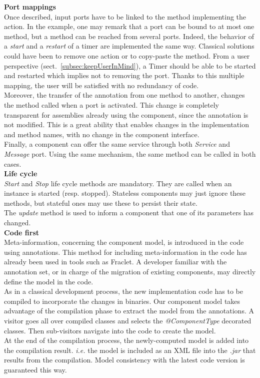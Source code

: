 {\bf Port mappings}\\
Once described, input ports have to be linked to the method implementing the action. In the example, one may remark that a port can be bound to at most one method, but a method can be reached from several ports. Indeed, the behavior of a {\it start} and a {\it restart} of a timer are implemented the same way. Classical solutions could have been to remove one action or to copy-paste the method. From a user perspective (sect.~\ref{subsec:keepUserInMind}), a Timer should be able to be started and restarted which implies not to removing the port. Thanks to this multiple mapping, the user will be satisfied with no redundancy of code.\\
Moreover, the transfer of the annotation from one method to another, changes the method called when a port is activated. This change is completely transparent for assemblies already using the component, since the annotation is not modified. This is a great ability that enables changes in the implementation and method names, with no change in the component interface.\\
Finally, a component can offer the same service through both {\it Service} and {\it Message} port. Using the same mechanism, the same method can be called in both cases.\\

{\bf Life cycle}\\
{\it Start} and {\it Stop} life cycle methods are mandatory. They are called when an instance is started (resp. stopped). Stateless components may just ignore these methods, but stateful ones may use these to persist their state.\\
The {\it update} method is used to inform a component that one of its parameters has changed.\\

{\bf Code first}\\
Meta-information, concerning the component model, is introduced in the code using annotations. This method for including meta-information in the code has already been used in tools such as Fraclet\cite{Rouvoy:2009}. A developer familiar with the annotation set, or in charge of the migration of existing components, may directly define the model in the code.\\
As in a classical development process, the new implementation code has to be compiled to incorporate the changes in binaries. Our component model takes advantage of the compilation phase to extract the model from the annotations. A visitor goes all over compiled classes and selects the {\it @ComponentType} decorated classes. Then sub-visitors navigate into the code to create the model.\\
At the end of the compilation process, the newly-computed model is added into the compilation result. {\it i.e.} the model is included as an XML file into the {\it .jar} that results from the compilation. Model consistency with the latest code version is guaranteed this way.\\


